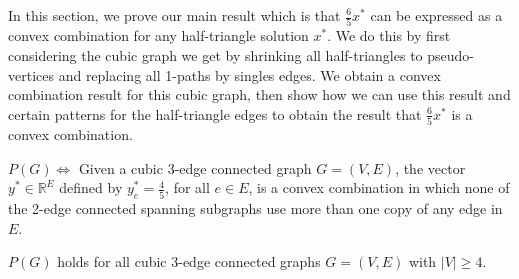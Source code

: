 \documentclass[oneeqnum,final]{siamltex1213}
\newcommand{\Real}{{\mathbb R}}
\begin{document}
In this section, we prove our main result which is that $\frac{6}{5}x^{*}$ can be expressed as a convex combination for any half-triangle solution $x^{*}$. We do this by first considering the cubic graph we get by shrinking all half-triangles to pseudo-vertices and replacing all 1-paths by singles edges. We obtain a convex combination result for this cubic graph, then show how we can use this result and certain patterns for the half-triangle edges to obtain the result that $\frac{6}{5}x^{*}$ is a convex combination.

\begin{definition}
$P(G) \Leftrightarrow $ Given a cubic 3-edge connected graph $G=(V, E)$, the vector $y^{*}\in\Real^{E}$ defined by $y^{*}_{e} = \frac{4}{5}$, for all $e \in E$, is a convex combination in which none of the 2-edge connected spanning subgraphs use more than one copy of any edge in $E$.
\end{definition}

\begin{lemma}\label{thmThreeSeventh}
$P(G)$ holds for all cubic 3-edge connected graphs $G=(V, E)$ with $|V| \geq 4$.
\end{lemma}
\end{document}

